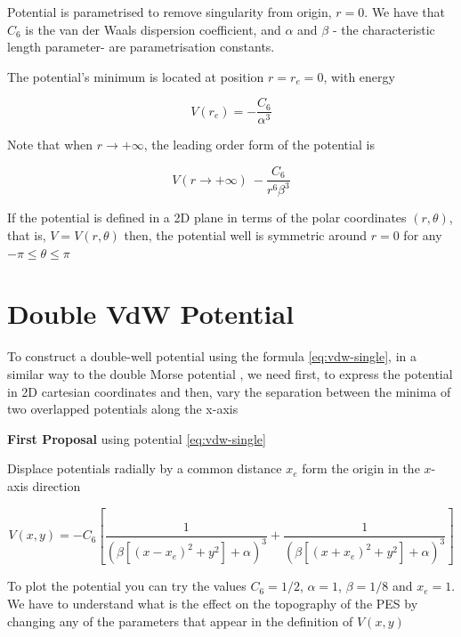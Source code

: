 \documentclass[10pt,aps,onecolumn,superscriptaddress]{revtex4-2}
\begin{document}
Potential is parametrised to remove singularity from origin, $r = 0$. We have that $C_6$ is the van der Waals dispersion coefficient, and $\alpha$ and $\beta$  - the characteristic length parameter- are parametrisation constants.

The potential's minimum is located at position $r = r_e = 0$, with energy 

\begin{equation*}
    V\left( r_e \right) = - \frac{C_6}{\alpha^3}
\end{equation*}

Note that when $r \longrightarrow +\infty $, the leading order form of the potential is

\begin{equation*}
    V(r \longrightarrow +\infty) ~ - \frac{C_6}{r^6 \beta^3}
\end{equation*}

If the potential is defined in a 2D plane in terms of the polar coordinates $(r, \theta)$, that is, $V = V(r, \theta)$ then, the potential well is symmetric around $r = 0$ for any $ -\pi \leq \theta \leq \pi$

\section{Double VdW Potential}

To construct a double-well potential using the formula \eqref{eq:vdw-single}, in a similar way to the double Morse potential \cite{GonzalezMontoya2020}, we need first, to express the potential in 2D cartesian coordinates and then, vary the separation between the minima of two overlapped potentials along the x-axis

\textbf{First Proposal} using potential \eqref{eq:vdw-single}

Displace potentials radially by a common distance $x_e$ form the origin in the $x$-axis direction




\begin{equation}
    V(x, y) = -C_6 \left[ \dfrac{1}{\left(\beta\left[\left(x - x_e\right)^2 + y^2\right] + \alpha\right)^3} + \dfrac{1}{\left(\beta\left[\left(x + x_e\right)^2 + y^2\right] + \alpha\right)^3} \right]
    \label{eq:vdw-double}
\end{equation}

To plot the potential you can try the values $C_6 = 1/2$, $\alpha = 1$, $\beta = 1/8$ and $x_e = 1$. We have to understand what is the effect on the topography of the PES by changing any of the parameters that appear in the definition of $V(x,y)$
\end{document}
